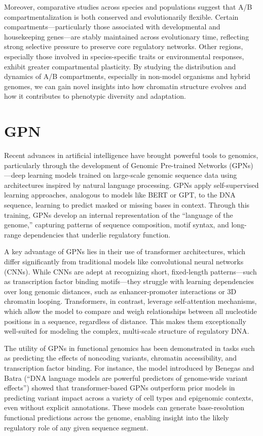\documentclass[
  a4paper,
]{scrbook}
\begin{document}
Moreover, comparative studies across species and populations suggest
that A/B compartmentalization is both conserved and evolutionarily
flexible. Certain compartments---particularly those associated with
developmental and housekeeping genes---are stably maintained across
evolutionary time, reflecting strong selective pressure to preserve core
regulatory networks. Other regions, especially those involved in
species-specific traits or environmental responses, exhibit greater
compartmental plasticity. By studying the distribution and dynamics of
A/B compartments, especially in non-model organisms and hybrid genomes,
we can gain novel insights into how chromatin structure evolves and how
it contributes to phenotypic diversity and adaptation.

\chapter{GPN}\label{gpn}

Recent advances in artificial intelligence have brought powerful tools
to genomics, particularly through the development of Genomic Pre-trained
Networks (GPNs)---deep learning models trained on large-scale genomic
sequence data using architectures inspired by natural language
processing. GPNs apply self-supervised learning approaches, analogous to
models like BERT or GPT, to the DNA sequence, learning to predict masked
or missing bases in context. Through this training, GPNs develop an
internal representation of the ``language of the genome,'' capturing
patterns of sequence composition, motif syntax, and long-range
dependencies that underlie regulatory function.

A key advantage of GPNs lies in their use of transformer architectures,
which differ significantly from traditional models like convolutional
neural networks (CNNs). While CNNs are adept at recognizing short,
fixed-length patterns---such as transcription factor binding
motifs---they struggle with learning dependencies over long genomic
distances, such as enhancer-promoter interactions or 3D chromatin
looping. Transformers, in contrast, leverage self-attention mechanisms,
which allow the model to compare and weigh relationships between all
nucleotide positions in a sequence, regardless of distance. This makes
them exceptionally well-suited for modeling the complex, multi-scale
structure of regulatory DNA.

The utility of GPNs in functional genomics has been demonstrated in
tasks such as predicting the effects of noncoding variants, chromatin
accessibility, and transcription factor binding. For instance, the model
introduced by Benegas and Batra (``DNA language models are powerful
predictors of genome-wide variant effects'') showed that
transformer-based GPNs outperform prior models in predicting variant
impact across a variety of cell types and epigenomic contexts, even
without explicit annotations. These models can generate base-resolution
functional predictions across the genome, enabling insight into the
likely regulatory role of any given sequence segment.
\end{document}
